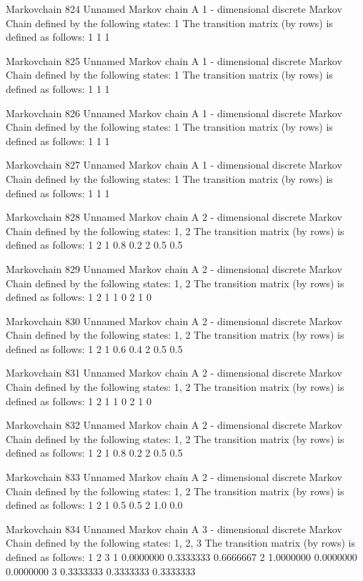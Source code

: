\documentclass[
  nojss]{jss}
\begin{document}
\begin{CodeChunk}
\begin{CodeOutput}
Markovchain  824 
Unnamed Markov chain 
 A  1 - dimensional discrete Markov Chain defined by the following states: 
 1 
 The transition matrix  (by rows)  is defined as follows: 
  1
1 1

Markovchain  825 
Unnamed Markov chain 
 A  1 - dimensional discrete Markov Chain defined by the following states: 
 1 
 The transition matrix  (by rows)  is defined as follows: 
  1
1 1

Markovchain  826 
Unnamed Markov chain 
 A  1 - dimensional discrete Markov Chain defined by the following states: 
 1 
 The transition matrix  (by rows)  is defined as follows: 
  1
1 1

Markovchain  827 
Unnamed Markov chain 
 A  1 - dimensional discrete Markov Chain defined by the following states: 
 1 
 The transition matrix  (by rows)  is defined as follows: 
  1
1 1

Markovchain  828 
Unnamed Markov chain 
 A  2 - dimensional discrete Markov Chain defined by the following states: 
 1, 2 
 The transition matrix  (by rows)  is defined as follows: 
    1   2
1 0.8 0.2
2 0.5 0.5

Markovchain  829 
Unnamed Markov chain 
 A  2 - dimensional discrete Markov Chain defined by the following states: 
 1, 2 
 The transition matrix  (by rows)  is defined as follows: 
  1 2
1 1 0
2 1 0

Markovchain  830 
Unnamed Markov chain 
 A  2 - dimensional discrete Markov Chain defined by the following states: 
 1, 2 
 The transition matrix  (by rows)  is defined as follows: 
    1   2
1 0.6 0.4
2 0.5 0.5

Markovchain  831 
Unnamed Markov chain 
 A  2 - dimensional discrete Markov Chain defined by the following states: 
 1, 2 
 The transition matrix  (by rows)  is defined as follows: 
  1 2
1 1 0
2 1 0

Markovchain  832 
Unnamed Markov chain 
 A  2 - dimensional discrete Markov Chain defined by the following states: 
 1, 2 
 The transition matrix  (by rows)  is defined as follows: 
    1   2
1 0.8 0.2
2 0.5 0.5

Markovchain  833 
Unnamed Markov chain 
 A  2 - dimensional discrete Markov Chain defined by the following states: 
 1, 2 
 The transition matrix  (by rows)  is defined as follows: 
    1   2
1 0.5 0.5
2 1.0 0.0

Markovchain  834 
Unnamed Markov chain 
 A  3 - dimensional discrete Markov Chain defined by the following states: 
 1, 2, 3 
 The transition matrix  (by rows)  is defined as follows: 
          1         2         3
1 0.0000000 0.3333333 0.6666667
2 1.0000000 0.0000000 0.0000000
3 0.3333333 0.3333333 0.3333333


\end{CodeOutput}
\end{CodeChunk}
\end{document}
